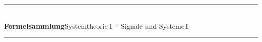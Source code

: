 \clearpage
{}
\pagestyle{empty}

\setlength{\parindent}{0pt}
\setlength{\abovedisplayskip}{2pt}
\setlength{\belowdisplayskip}{2pt}
\setlength{\abovedisplayshortskip}{1pt}
\setlength{\belowdisplayshortskip}{1pt}
\setlength{\columnsep}{1.4em}
\setlength{\columnseprule}{0.4pt}

\newcommand{\ft}[2]{%
  \par\smallskip\penalty-200
  {\bfseries\footnotesize #1}\nobreak\hfill{\tiny\hyperref[#2]{\S\,\ref*{#2}}}\par\nobreak
  \vspace{-0.35em}{\color{accent}\hrule height 0.4pt}\nobreak\vspace{0.2em}\nobreak}

\begin{center}
  {\color{accent}\rule{\linewidth}{1pt}}\\[0.2em]
  {\Large\bfseries Formelsammlung}\quad\small Systemtheorie\,1 -- Signale und Systeme\,I\\[0.1em]
  {\color{accent}\rule{\linewidth}{1pt}}
\end{center}
\vspace{0.4em}


